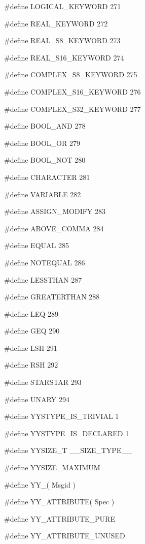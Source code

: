 \medskip
{\stt \#define LOGICAL\_KEYWORD 271}

\medskip
{\stt \#define REAL\_KEYWORD 272}

\medskip
{\stt \#define REAL\_S8\_KEYWORD 273}

\medskip
{\stt \#define REAL\_S16\_KEYWORD 274}

\medskip
{\stt \#define COMPLEX\_S8\_KEYWORD 275}

\medskip
{\stt \#define COMPLEX\_S16\_KEYWORD 276}

\medskip
{\stt \#define COMPLEX\_S32\_KEYWORD 277}

\medskip
{\stt \#define BOOL\_AND 278}

\medskip
{\stt \#define BOOL\_OR 279}

\medskip
{\stt \#define BOOL\_NOT 280}

\medskip
{\stt \#define CHARACTER 281}

\medskip
{\stt \#define VARIABLE 282}

\medskip
{\stt \#define ASSIGN\_MODIFY 283}

\medskip
{\stt \#define ABOVE\_COMMA 284}

\medskip
{\stt \#define EQUAL 285}

\medskip
{\stt \#define NOTEQUAL 286}

\medskip
{\stt \#define LESSTHAN 287}

\medskip
{\stt \#define GREATERTHAN 288}

\medskip
{\stt \#define LEQ 289}

\medskip
{\stt \#define GEQ 290}

\medskip
{\stt \#define LSH 291}

\medskip
{\stt \#define RSH 292}

\medskip
{\stt \#define STARSTAR 293}

\medskip
{\stt \#define UNARY 294}

\medskip
{\stt \#define YYSTYPE\_IS\_TRIVIAL 1}

\medskip
{\stt \#define YYSTYPE\_IS\_DECLARED 1}

\medskip
{\stt \#define YYSIZE\_T \_\_SIZE\_TYPE\_\_}

\medskip
{\stt \#define YYSIZE\_MAXIMUM}

\medskip
{\stt \#define YY\_( Msgid )}

\medskip
{\stt \#define YY\_ATTRIBUTE( Spec )}

\medskip
{\stt \#define YY\_ATTRIBUTE\_PURE}

\medskip
{\stt \#define YY\_ATTRIBUTE\_UNUSED}

